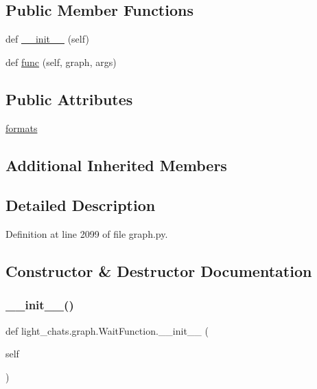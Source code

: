 \subsection*{Public Member Functions}
\begin{DoxyCompactItemize}
\item 
def \hyperlink{classlight__chats_1_1graph_1_1WaitFunction_a08ecc57f17be491ed6a1ee81f38d8d65}{\+\_\+\+\_\+init\+\_\+\+\_\+} (self)
\item 
def \hyperlink{classlight__chats_1_1graph_1_1WaitFunction_a3349dc4d65c4b33440624bdbbeeb420c}{func} (self, graph, args)
\end{DoxyCompactItemize}
\subsection*{Public Attributes}
\begin{DoxyCompactItemize}
\item 
\hyperlink{classlight__chats_1_1graph_1_1WaitFunction_a02e41ee37f4a2fe83153606100a5f979}{formats}
\end{DoxyCompactItemize}
\subsection*{Additional Inherited Members}


\subsection{Detailed Description}


Definition at line 2099 of file graph.\+py.



\subsection{Constructor \& Destructor Documentation}
\mbox{\label{classlight__chats_1_1graph_1_1WaitFunction_a08ecc57f17be491ed6a1ee81f38d8d65}} 
\subsubsection{\texorpdfstring{\+\_\+\+\_\+init\+\_\+\+\_\+()}{\_\_init\_\_()}}
{\footnotesize\ttfamily def light\+\_\+chats.\+graph.\+Wait\+Function.\+\_\+\+\_\+init\+\_\+\+\_\+ (\begin{DoxyParamCaption}\item[{}]{self }\end{DoxyParamCaption})}



